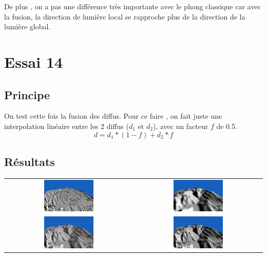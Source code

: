 \documentclass[a4paper]{article}
\begin{document}
De plus , on a pas une différence très importante avec le phong classique car avec la fusion, la direction de lumière local se rapproche plus de la direction de la lumière global.
 



\section{Essai 14}
\subsection{Principe}
On test cette fois la fusion des diffus.
Pour ce faire , on fait juste une interpolation linéaire entre les 2 diffus ($d_1$ et $d_2$), avec un facteur $f$ de 0.5.
\[ d = d_1 *(1 - f) + d_2*f \]
  

\subsection{Résultats}

\begin{tabular}{cc}
\includegraphics[width=0.4\textwidth]{Images/Essais/Essai_14_details.png}&
\includegraphics[width=0.4\textwidth]{Images/Essais/Essai_14_flou.png} \\
\includegraphics[width=0.4\textwidth]{Images/Essais/Essai_14_fusion.png}&
\includegraphics[width=0.4\textwidth]{Images/Essais/Essai_14_phong.png}\\
\end{tabular}
\end{document}

